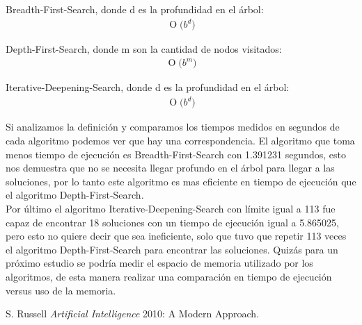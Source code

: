 \documentclass[letter, 10pt]{article}
\newcommand{\BigO}[1]{\ensuremath{\operatorname{O}\bigl(#1\bigr)}}
\begin{document}
Breadth-First-Search, donde d es la profundidad en el árbol:
\begin{align*}
    \BigO{b^d}
\end{align*}

Depth-First-Search, donde m son la cantidad de nodos visitados:
\begin{align*}
    \BigO{b^m}
\end{align*}

Iterative-Deepening-Search, donde d es la profundidad en el árbol:
\begin{align*}
    \BigO{b^d}
\end{align*}

Si analizamos la definición y comparamos los tiempos medidos en segundos de cada algoritmo podemos ver que hay una correspondencia. El algoritmo que toma menos tiempo de ejecución es Breadth-First-Search con 1.391231 segundos, esto nos demuestra que no se necesita llegar profundo en el árbol para llegar a las soluciones, por lo tanto este algoritmo es mas eficiente en tiempo de ejecución que el algoritmo Depth-First-Search.\\

Por último el algoritmo Iterative-Deepening-Search con límite igual a 113 fue capaz de encontrar 18 soluciones con un tiempo de ejecución igual a 5.865025, pero esto no quiere decir que sea ineficiente, solo que tuvo que repetir 113 veces el algoritmo Depth-First-Search para encontrar las soluciones. Quizás para un próximo estudio se podría medir el espacio de memoria utilizado por los algoritmos, de esta manera realizar una comparación en tiempo de ejecución versus uso de la memoria.




\begin{thebibliography}{10} %
     S. Russell {\em Artificial Intelligence} 2010: A Modern Approach.
\end{thebibliography} 

\end{document}
